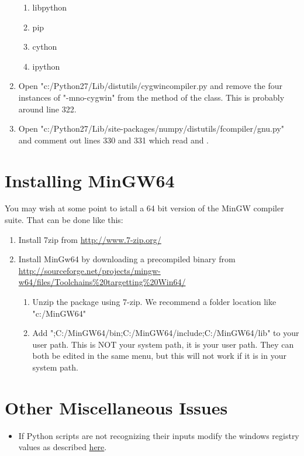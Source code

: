 \begin{enumerate}
\begin{enumerate}
	\item libpython
	\item pip
	\item cython
	\item ipython
\end{enumerate}
\item Open "c:/Python27/Lib/distutils/cygwincompiler.py and remove the four instances of "-mno-cygwin" from the  method of the  class.
This is probably around line 322.
\item Open "c:/Python27/Lib/site-packages/numpy/distutils/fcompiler/gnu.py" and comment out lines 330 and 331 which read  and .
\end{enumerate}

\section*{Installing MinGW64}
You may wish at some point to istall a 64 bit version of the MinGW compiler suite.
That can be done like this:
\begin{enumerate}
\item Install 7zip from \url{http://www.7-zip.org/}
\item Install MinGw64 by downloading a precompiled binary from \url{http://sourceforge.net/projects/mingw-w64/files/Toolchains%20targetting%20Win64/} 
\begin{enumerate}
	\item Unzip the package using 7-zip.
		We recommend a folder location like "c:/MinGW64"
	\item Add ";C:/MinGW64/bin;C:/MinGW64/include;C:/MinGW64/lib" to your user path.
		This is NOT your system path, it is your user path.
		They can both be edited in the same menu, but this will not work if it is in your system path.
\end{enumerate}
\end{enumerate}

\section*{Other Miscellaneous Issues}
\begin{itemize}
\item If Python scripts are not recognizing their inputs modify the windows registry values as described \href{http://stackoverflow.com/questions/2640971/windows-is-not-passing-command-line-arguments-to-python-programs-executed-from-t}{here}.
\end{itemize}

